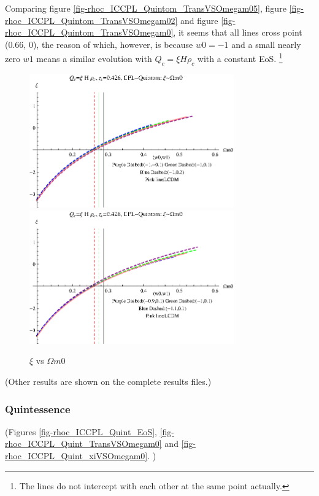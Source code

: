 \documentclass[12pt,a4paper]{article}
\begin{document}
Comparing figure \ref{fig-rhoc_ICCPL_Quintom_TransVSOmegam05}, figure \ref{fig-rhoc_ICCPL_Quintom_TransVSOmegam02} and figure \ref{fig-rhoc_ICCPL_Quintom_TransVSOmegam0}, it seems that all lines cross point (0.66, 0), the reason of which, however, is because $w0=-1$ and a small nearly zero $w1$ means a similar evolution with $Q_c=\xi H\rho_c$ with a constant EoS. \footnote{The lines do not intercept with each other at the same point actually.}

\begin{figure}
\centering
\includegraphics[width=250pt]{rhoc_ICCPL_Quintom_xiVSOmegam01.eps}
\includegraphics[width=250pt]{rhoc_ICCPL_Quintom_xiVSOmegam02.eps}
\caption{$\xi$ vs $\Omega m0$}\label{fig-rhoc_ICCPL_Quintom_xiVSOmegam0}
\end{figure}



(Other results are shown on the complete results files.)




\subsubsection{Quintessence}

(Figures \ref{fig-rhoc_ICCPL_Quint_EoS}, \ref{fig-rhoc_ICCPL_Quint_TransVSOmegam0} and \ref{fig-rhoc_ICCPL_Quint_xiVSOmegam0}. )
\end{document}
